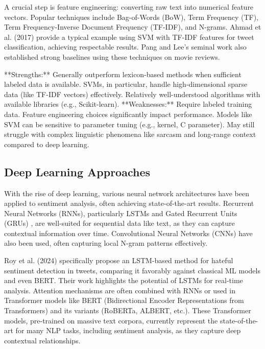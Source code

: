 \documentclass[10pt,twocolumn]{article}
\begin{document}
A crucial step is feature engineering: converting raw text into numerical feature vectors. Popular techniques include Bag-of-Words (BoW), Term Frequency (TF), Term Frequency-Inverse Document Frequency (TF-IDF), and N-grams. Ahmad et al. (2017) \cite{ref:ahmad2017} provide a typical example using SVM with TF-IDF features for tweet classification, achieving respectable results. Pang and Lee's seminal work \cite{ref:pang_lee_sentiment} also established strong baselines using these techniques on movie reviews.

**Strengths:** Generally outperform lexicon-based methods when sufficient labeled data is available. SVMs, in particular, handle high-dimensional sparse data (like TF-IDF vectors) effectively. Relatively well-understood algorithms with available libraries (e.g., Scikit-learn).
**Weaknesses:** Require labeled training data. Feature engineering choices significantly impact performance. Models like SVM can be sensitive to parameter tuning (e.g., kernel, C parameter). May still struggle with complex linguistic phenomena like sarcasm and long-range context compared to deep learning.

\subsection{Deep Learning Approaches}
With the rise of deep learning, various neural network architectures have been applied to sentiment analysis, often achieving state-of-the-art results. Recurrent Neural Networks (RNNs), particularly LSTMs \cite{ref:lstm_hochreiter} and Gated Recurrent Units (GRUs) \cite{ref:gru_cho}, are well-suited for sequential data like text, as they can capture contextual information over time. Convolutional Neural Networks (CNNs) \cite{ref:cnn_kim} have also been used, often capturing local N-gram patterns effectively.

Roy et al. (2024) \cite{ref:roy2024} specifically propose an LSTM-based method for hateful sentiment detection in tweets, comparing it favorably against classical ML models and even BERT. Their work highlights the potential of LSTMs for real-time analysis. Attention mechanisms \cite{ref:attention_bahdanau} are often combined with RNNs or used in Transformer models \cite{ref:transformer_vaswani} like BERT (Bidirectional Encoder Representations from Transformers) \cite{ref:bert_devlin} and its variants (RoBERTa, ALBERT, etc.). These Transformer models, pre-trained on massive text corpora, currently represent the state-of-the-art for many NLP tasks, including sentiment analysis, as they capture deep contextual relationships.
\end{document}
